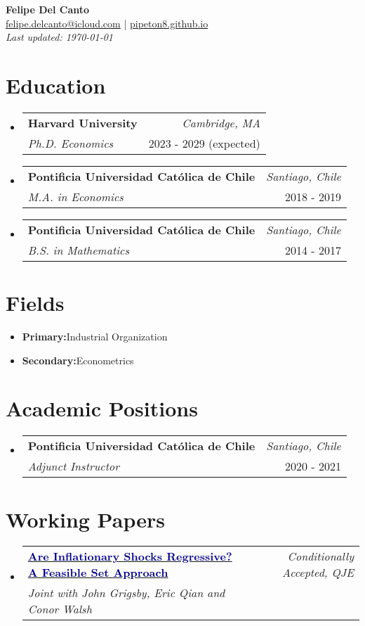 \documentclass[a4paper,11pt]{article}
\makeatletter
\newcommand{\resumeItem}[2]{
  \item[]{
    \textbf{#1}{\hspace{0.5mm}#2 \vspace{-0.5mm}}
  }
}
\newcommand{\resumeSubheading}[4]{
\vspace{0.5mm}\item[]
    \begin{tabular*}{0.98\textwidth}[t]{l@{\extracolsep{\fill}}r}
        \textbf{#1} & \textit{\footnotesize{#2}} \\
        \textit{\footnotesize{#3}} &  \footnotesize{#4}\\
    \end{tabular*}
    \vspace{-1ex}
}
\newcommand{\resumeSubItem}[2]{\resumeItem{#1}{#2}\vspace{-4pt}}
\newcommand{\resumeSubHeadingListStart}{\begin{itemize}[leftmargin=*,labelsep=1mm]}
\newcommand{\resumeHeadingSkillStart}{\begin{itemize}[leftmargin=*,itemsep=1.7mm, rightmargin=2ex]}
\newcommand{\ListEnd}{\end{itemize}\vspace{-2mm}}
\newcommand{\headerfontiii}{\fontfamily{ppl}\selectfont} %
\makeatother
\begin{document}
\headerfontiii

\begin{center}
    {\Huge\textbf{Felipe Del Canto}} \\[1ex]

	\small{
    \href{mailto:felipe.delcanto@icloud.com}{felipe.delcanto@icloud.com} | 
    \href{https://pipeton8.github.io/}{pipeton8.github.io} \\[1ex]
	\textit{Last updated: \monthyeardate\today}
    }
\end{center}

\section{\textbf{Education}}
\resumeSubHeadingListStart
	\resumeSubheading
	{Harvard University}{Cambridge, MA}
	{Ph.D. Economics}{2023 - 2029 (expected)}

	\resumeSubheading
	{Pontificia Universidad Católica de Chile}{Santiago, Chile}
	{M.A. in Economics}{2018 - 2019}

	\resumeSubheading
	{Pontificia Universidad Católica de Chile}{Santiago, Chile}
	{B.S. in Mathematics}{2014 - 2017}
\ListEnd

\section{\textbf{Fields}}
\resumeHeadingSkillStart
	\resumeSubItem{Primary:}
	{Industrial Organization}
	\resumeSubItem{Secondary:}{Econometrics}
\ListEnd

\section{\textbf{Academic Positions}}
\resumeSubHeadingListStart
	\resumeSubheading
	{Pontificia Universidad Católica de Chile}{Santiago, Chile}
	{Adjunct Instructor}{2020 - 2021}
\ListEnd

\section{\textbf{Working Papers}}

\resumeSubHeadingListStart
	\resumeSubheading
	{\href{https://www.dropbox.com/scl/fi/yhdiyv3n0waeib74tnrnu/InflationRegressivity.pdf?rlkey=t9x4sb14h9fg0hzvvtp8855j2}{\textcolor{darkblue}{Are Inflationary Shocks Regressive? A Feasible Set Approach}}}
	{Conditionally Accepted, QJE}
	{Joint with John Grigsby, Eric Qian and Conor Walsh}
	{}
\ListEnd
\end{document}
